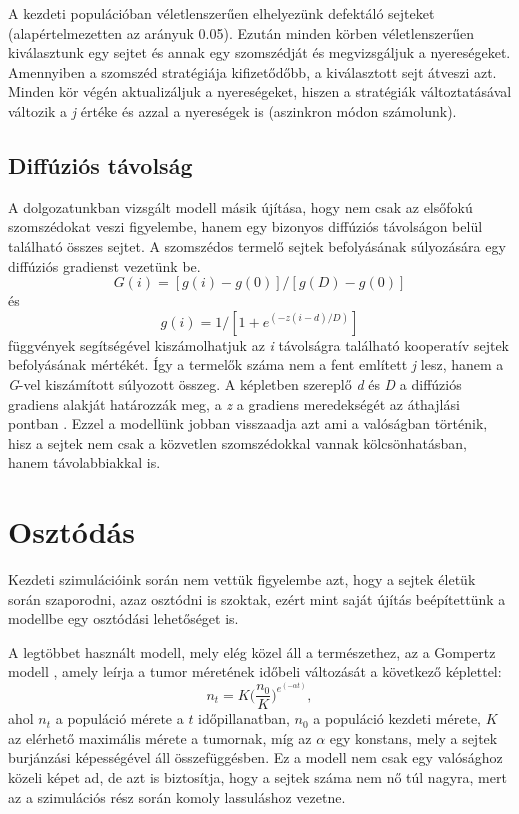 A kezdeti populációban véletlenszerűen elhelyezünk defektáló sejteket (alapértelmezetten az arányuk 0.05). Ezután minden körben véletlenszerűen kiválasztunk egy sejtet és annak egy szomszédját és megvizsgáljuk a nyereségeket. Amennyiben a szomszéd stratégiája kifizetődőbb, a kiválasztott sejt átveszi azt. Minden kör végén aktualizáljuk a nyereségeket, hiszen a stratégiák változtatásával változik a \textit{j} értéke és azzal a nyereségek is (aszinkron módon számolunk). 

\subsection{Diffúziós távolság}
A dolgozatunkban vizsgált modell másik újítása, hogy nem csak az elsőfokú szomszédokat veszi figyelembe, hanem egy bizonyos diffúziós távolságon belül található összes sejtet. A szomszédos termelő sejtek befolyásának súlyozására egy diffúziós gradienst vezetünk be. 
\begin{equation}
G(i) = [g(i) - g(0)]/[g(D) - g(0)] 
\end{equation}
és
\begin{equation} \label{eq:diffGradient}
g(i) = 1/[1 + e^{(-z(i-d)/D)}]
\end{equation}
függvények segítségével kiszámolhatjuk az \textit{i} távolságra található kooperatív sejtek befolyásának mértékét. Így a termelők száma nem a fent említett \textit{j} lesz, hanem a \textit{G}-vel kiszámított súlyozott összeg. A képletben szereplő \textit{d} és \textit{D} a diffúziós gradiens alakját határozzák meg, a \textit{z} a gradiens meredekségét az áthajlási pontban \cite{archetti2016cooperation}. Ezzel a modellünk jobban visszaadja azt ami a valóságban történik, hisz a sejtek nem csak a közvetlen szomszédokkal vannak kölcsönhatásban, hanem távolabbiakkal is.

\section{Osztódás}
Kezdeti szimulációink során nem vettük figyelembe azt, hogy a sejtek életük során szaporodni, azaz osztódni is szoktak, ezért mint saját újítás beépítettünk a modellbe egy osztódási lehetőséget is. 

A legtöbbet használt modell, mely elég közel áll a természethez, az a Gompertz modell \cite{wiki:gompertz}, amely leírja a tumor méretének időbeli változását a következő képlettel:
\begin{equation}
	\label{eq:gompertz}
	n_t = K \bigg(\frac{n_0}{K} \bigg) ^ {e^{(- \alpha t)}},
\end{equation}
ahol $n_t$ a populáció mérete a $t$ időpillanatban, $n_0$ a populáció kezdeti mérete, $K$ az elérhető maximális mérete a tumornak, míg az $\alpha$ egy konstans, mely a sejtek burjánzási képességével áll összefüggésben. Ez a modell nem csak egy valósághoz közeli képet ad, de azt is biztosítja, hogy a sejtek száma nem nő túl nagyra, mert az a szimulációs rész során komoly lassuláshoz vezetne. 

